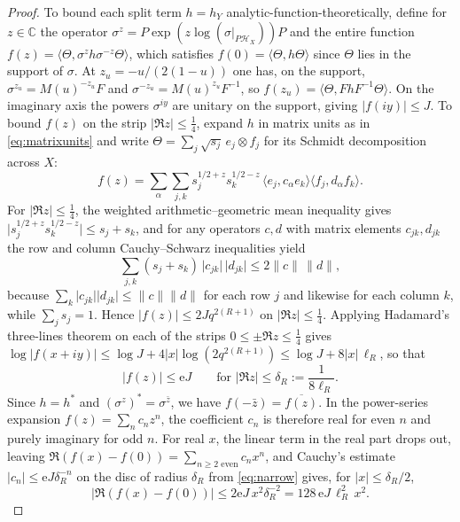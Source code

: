 \documentclass[aps,prx,reprint,superscriptaddress,floatfix,nofootinbib,longbibliography,amsmath,amssymb]{revtex4-2}
\newcommand{\C}{\mathbb C}
\newcommand{\norm}[1]{\lVert #1\rVert}
\newcommand{\abs}[1]{\lvert #1\rvert}
\newcommand{\cH}{\mathcal H}
\newcommand{\e}{\mathrm e}
\theoremstyle{plain}
\theoremstyle{definition}
\begin{document}
\begin{proof}
To bound each split term $h=h_Y$ analytic-function-theoretically, define for
$z\in\C$ the operator $\sigma^z=P\exp(z\log(\sigma|_{P\cH_X}))P$ and the
entire function $f(z)=\langle\Theta,\sigma^zh\sigma^{-z}\Theta\rangle$,
which satisfies $f(0)=\langle\Theta,h\Theta\rangle$ since $\Theta$ lies in
the support of $\sigma$. At $z_u=-u/(2(1-u))$ one has, on the support,
$\sigma^{z_u}=M(u)^{-z_u}F$ and $\sigma^{-z_u}=M(u)^{z_u}F^{-1}$, so
$f(z_u)=\langle\Theta,Fh F^{-1}\Theta\rangle$. On the imaginary axis the
powers $\sigma^{iy}$ are unitary on the support, giving $\abs{f(iy)}\le J$.
To bound $f(z)$ on the strip $\abs{\Re z}\le\tfrac14$, expand $h$ in matrix
units as in \eqref{eq:matrixunits} and write
$\Theta=\sum_j\sqrt{s_j}\,e_j\otimes f_j$ for its Schmidt decomposition
across $X$:
\[
 f(z)=\sum_\alpha\sum_{j,k}s_j^{1/2+z}s_k^{1/2-z}\,
 \langle e_j,c_\alpha e_k\rangle\langle f_j,d_\alpha f_k\rangle .
\]
For $\abs{\Re z}\le\frac14$, the weighted arithmetic--geometric mean
inequality gives $\abs{s_j^{1/2+z}s_k^{1/2-z}}\le s_j+s_k$, and for any
operators $c,d$ with matrix elements $c_{jk},d_{jk}$ the row and column
Cauchy--Schwarz inequalities yield
\begin{equation}\label{eq:rowcolumn}
 \sum_{j,k}(s_j+s_k)\,\abs{c_{jk}}\,\abs{d_{jk}}\le 2\norm c\,\norm d ,
\end{equation}
because $\sum_k\abs{c_{jk}}\abs{d_{jk}}\le\norm c\norm d$ for each row $j$ and
likewise for each column $k$, while $\sum_j s_j=1$. Hence
$\abs{f(z)}\le 2Jq^{2(R+1)}$ on $\abs{\Re z}\le\frac14$. Applying
Hadamard's three-lines theorem on each of the strips $0\le\pm\Re z\le\frac14$
gives
$\log\abs{f(x+iy)}\le\log J+4\abs x\log(2q^{2(R+1)})\le \log J+8\abs x\,\ell_R$,
so that
\begin{equation}\label{eq:narrow}
 \abs{f(z)}\le \e J\qquad\text{for }\abs{\Re z}\le\delta_R:=\frac1{8\ell_R}.
\end{equation}
Since $h=h^*$ and $(\sigma^z)^*=\sigma^{\bar z}$, we have
$f(-\bar z)=\overline{f(z)}$. In the power-series expansion
$f(z)=\sum_nc_nz^n$, the coefficient $c_n$ is therefore real for even $n$
and purely imaginary for odd $n$. For real $x$, the linear term in the
real part drops out, leaving $\Re(f(x)-f(0))=\sum_{n\ge2\text{ even}}c_nx^n$,
and Cauchy's estimate $\abs{c_n}\le\e J\delta_R^{-n}$ on the disc of
radius $\delta_R$ from \eqref{eq:narrow} gives, for $\abs x\le\delta_R/2$,
\begin{equation}\label{eq:quadratic}
 \abs{\Re(f(x)-f(0))}\le 2\e J\,x^2\delta_R^{-2}=128\,\e J\,\ell_R^2\,x^2 .
\end{equation}

\end{proof}
\end{document}
